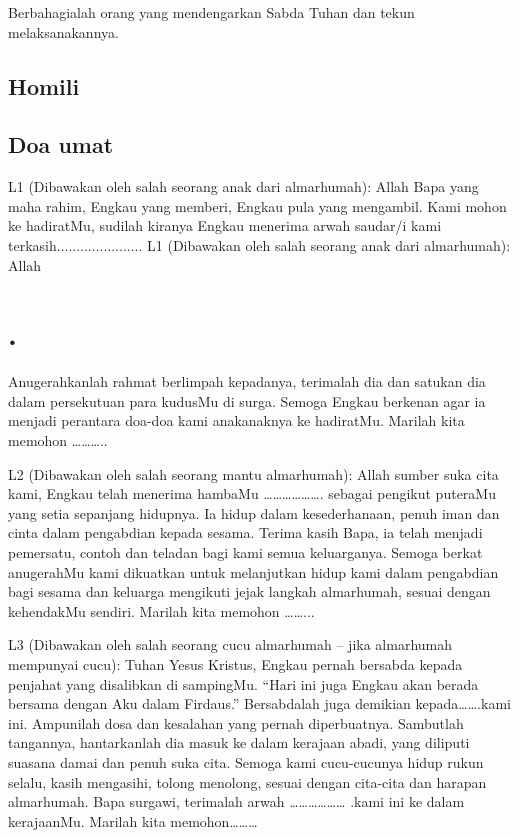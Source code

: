 Berbahagialah orang yang mendengarkan Sabda Tuhan dan
tekun melaksanakannya.

\subsection*{Homili}
\subsection*{Doa umat}

L1 (Dibawakan oleh salah seorang anak dari almarhumah): Allah
Bapa yang maha rahim, Engkau yang memberi, Engkau pula yang
mengambil. Kami mohon ke hadiratMu, sudilah kiranya Engkau
menerima arwah saudar/i kami terkasih......................
L1 (Dibawakan oleh salah seorang anak dari almarhumah): Allah
\section*{.}

Anugerahkanlah rahmat berlimpah kepadanya, terimalah dia dan
satukan dia dalam persekutuan para kudusMu di surga. Semoga
Engkau berkenan agar ia menjadi perantara doa-doa kami anakanaknya
ke hadiratMu. Marilah kita memohon ………..

L2 (Dibawakan oleh salah seorang mantu almarhumah): Allah
sumber suka cita kami, Engkau telah menerima hambaMu
………………. sebagai pengikut puteraMu yang setia sepanjang
hidupnya. Ia hidup dalam kesederhanaan, penuh iman dan cinta
dalam pengabdian kepada sesama. Terima kasih Bapa, ia telah
menjadi pemersatu, contoh dan teladan bagi kami semua
keluarganya. Semoga berkat anugerahMu kami dikuatkan untuk
melanjutkan hidup kami dalam pengabdian bagi sesama dan keluarga
mengikuti jejak langkah almarhumah, sesuai dengan kehendakMu
sendiri. Marilah kita memohon ……...

L3 (Dibawakan oleh salah seorang cucu almarhumah – jika
almarhumah mempunyai cucu): Tuhan Yesus Kristus, Engkau pernah
bersabda kepada penjahat yang disalibkan di sampingMu. “Hari ini
juga Engkau akan berada bersama dengan Aku dalam Firdaus.”
Bersabdalah juga demikian kepada…….kami ini. Ampunilah dosa
dan kesalahan yang pernah diperbuatnya. Sambutlah tangannya,
hantarkanlah dia masuk ke dalam kerajaan abadi, yang diliputi
suasana damai dan penuh suka cita. Semoga kami cucu-cucunya
hidup rukun selalu, kasih mengasihi, tolong menolong, sesuai dengan
cita-cita dan harapan almarhumah. Bapa surgawi, terimalah arwah
……………… .kami ini ke dalam kerajaanMu. Marilah kita
memohon………

